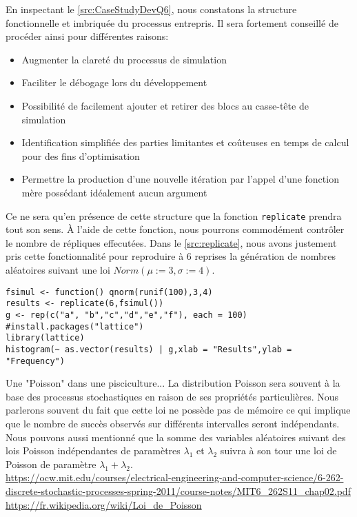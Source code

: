 En inspectant le \autoref{src:CaseStudyDevQ6}, nous constatons la structure fonctionnelle et imbriquée du processus entrepris. Il sera fortement conseillé de procéder ainsi pour différentes raisons:

\begin{itemize}
	\item Augmenter la clareté du processus de simulation
	\item Faciliter le débogage lors du développement
	\item Possibilité de facilement ajouter et retirer des blocs au casse-tête de simulation
	\item Identification simplifiée des parties limitantes et coûteuses en temps de calcul pour des fins d'optimisation
	\item Permettre la production d'une nouvelle itération par l'appel d'une fonction mère possédant idéalement aucun argument
\end{itemize}

Ce ne sera qu'en présence de cette structure que la fonction \texttt{replicate} prendra tout son sens. À l'aide de cette fonction, nous pourrons commodément contrôler le nombre de répliques effecutées. Dans le \autoref{src:replicate}, nous avons justement pris cette fonctionnalité pour reproduire à 6 reprises la génération de nombres aléatoires suivant une loi $Norm(\mu := 3, \sigma := 4)$.

\begin{lstlisting}[caption = Replication d'une analyse stochastique,label=src:replicate]
fsimul <- function() qnorm(runif(100),3,4)
results <- replicate(6,fsimul())
g <- rep(c("a", "b","c","d","e","f"), each = 100)
#install.packages("lattice")
library(lattice)
histogram(~ as.vector(results) | g,xlab = "Results",ylab = "Frequency") 
\end{lstlisting}


\begin{moreInfo}{Une "Poisson" dans une pisciculture...}
	La distribution Poisson sera souvent à la base des processus stochastiques en raison de ses propriétés particulières. Nous parlerons souvent du fait que cette loi ne possède pas de mémoire ce qui implique que le nombre de succès observés sur différents intervalles seront indépendants. Nous pouvons aussi mentionné que la somme des variables aléatoires suivant des lois Poisson indépendantes de paramètres $\lambda_1$ et $\lambda_2$ suivra à son tour une loi de Poisson de paramètre $\lambda_1 + \lambda_2$. \\
	\url{https://ocw.mit.edu/courses/electrical-engineering-and-computer-science/6-262-discrete-stochastic-processes-spring-2011/course-notes/MIT6_262S11_chap02.pdf} \\
	\url{https://fr.wikipedia.org/wiki/Loi_de_Poisson}
\end{moreInfo}